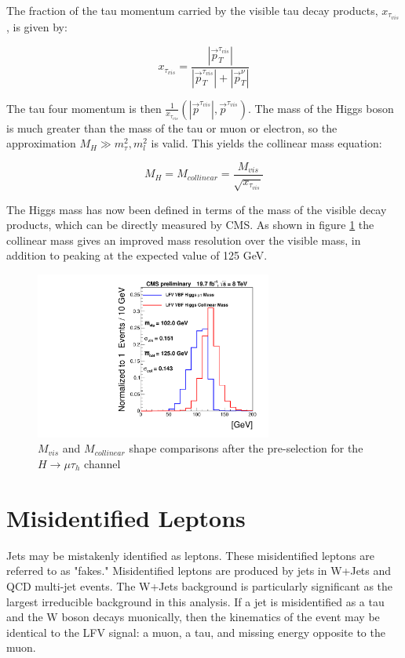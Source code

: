 \documentclass[oneside, letterpaper, oldfontcommands]{memoir}
\begin{document}
The fraction of the tau momentum carried by the visible tau decay products, $x_{\tau_{vis}}$, is given by:

\begin{equation}
x_{\tau_{vis}} = \frac{|\vec{p}_{T}^{\tau_{vis}}|}{|\vec{p}_{T}^{\tau_{vis}}| + |\vec{p}_{T}^{\nu}|}
\end{equation}

The tau four momentum is then $\frac{1}{x_{\tau_{vis}}}\left(|\vec{p}^{\tau_{vis}}|,\vec{p}^{\tau_{vis}}\right)$. The mass of the Higgs boson is much greater than the mass of the tau or muon or electron, so the approximation $M_{H} \gg m_{\tau}^2,m_{l}^2$ is valid. This yields the collinear mass equation:

\begin{equation} 
M_{H} = M_{collinear} = \frac{M_{vis}}{\sqrt{x_{\tau_{vis}}}}
\end{equation}

The Higgs mass has now been defined in terms of the mass of the visible decay products, which can be directly measured by CMS. As shown in figure \ref{fig:MvisMcol} the collinear mass gives an improved mass resolution over the visible mass, in addition to peaking at the expected value of 125 GeV. 

\begin{figure}[hbtp]\begin{center}
\includegraphics[height=5.5cm]{masses_muhad_VBF_After_Presel_signal.pdf}
 \caption{$M_{vis}$  and $M_{collinear}$  shape comparisons after the pre-selection for the $H \rightarrow \mu\tau_{h}$ channel}
 \label{fig:MvisMcol}\end{center}\end{figure}
 
\section{Misidentified Leptons}\label{fakes}
\qquad Jets may be mistakenly identified as leptons. These misidentified leptons are referred to as "fakes." Misidentified leptons are produced by jets in W+Jets and QCD multi-jet events. The W+Jets background is particularly significant as the largest irreducible background in this analysis. If a jet is misidentified as a tau and the W boson decays muonically, then the kinematics of the event may be identical to the LFV signal: a muon, a tau, and missing energy opposite to the muon. 
\end{document}
